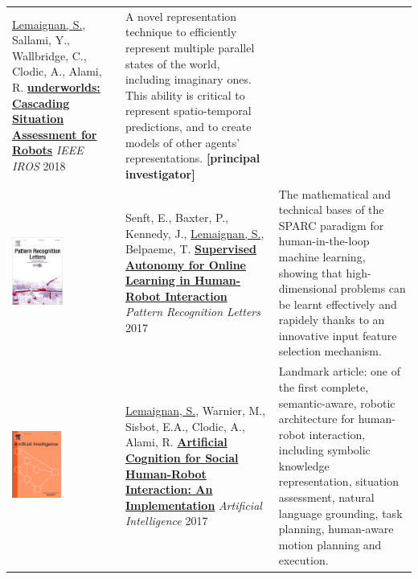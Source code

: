 \documentclass[11pt,a4paper]{report}
\begin{document}
\begin{tabular}{p{1.7cm}p{7cm}p{8cm}}
    \ul{Lemaignan, S.}, Sallami, Y., Wallbridge, C., Clodic, A., Alami,
    R. 
   \newline\href{https://doi.org/10.1109/IROS.2018.8594094}{\textbf{\sc
    underworlds: Cascading Situation Assessment for Robots}}
    \newline\textit{IEEE IROS} 2018

    & \small A novel representation technique to efficiently
    represent multiple parallel states of the world, including imaginary ones.
    This ability is critical to represent spatio-temporal predictions, and to
    create models of other agents' representations.
    \textbf{[principal investigator]}\\



    \vspace{-.20cm}\includegraphics[height=2.2cm]{thumbs/2017-sparc.jpg} &

    Senft, E., Baxter, P., Kennedy, J., \ul{Lemaignan, S.}, Belpaeme, T.
    \newline\href{https://doi.org/10.1016/j.patrec.2017.03.015}{\textbf{Supervised
    Autonomy for Online Learning in Human-Robot Interaction}}
    \newline \textit{Pattern Recognition Letters} 2017
    & \small The mathematical and technical bases of the SPARC
    paradigm for human-in-the-loop machine learning, showing that
    high-dimensional problems can be learnt effectively and rapidely thanks to
    an innovative input feature selection mechanism.
    \textbf{}\\


    \vspace{-.20cm}\includegraphics[height=2.2cm]{thumbs/2017-ai-cover.jpg} &

    \ul{Lemaignan, S.}, Warnier, M., Sisbot, E.A., Clodic, A., Alami, R.
    \newline
    \href{https://doi.org/10.1016/j.artint.2016.07.002}{\textbf{Artificial
    Cognition for Social Human-Robot Interaction: An Implementation}}
    \newline \textit{Artificial Intelligence} 2017
    & \small Landmark article: one of the first complete, semantic-aware, robotic architecture for
    human-robot interaction, including symbolic knowledge representation,
    situation assessment, natural language grounding, task planning, human-aware
    motion planning and execution. \textbf{}\\



\end{tabular}
\end{document}
